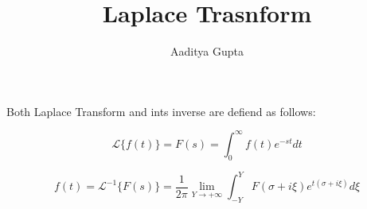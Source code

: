 \documentclass[12pt, onecolumn]{article}
\title{\bf{Laplace Trasnform}}
\author{Aaditya Gupta}
\begin{document}
\maketitle

Both Laplace Transform and ints inverse are defiend as follows:

\begin{equation}
    \mathcal{L}\{f(t)\} = F(s) = \int_{0}^{\infty} f(t)e^{-st} dt
    
    \label{eq: Laplace Transform}
\end{equation}

\begin{equation}
    f(t) = \mathcal{L}^{-1}\{ F(s) \} = \frac{1}{2\pi} \lim_{Y \to +\infty} \int_{-Y}^{Y} F(\sigma + i\xi)e^{t(\sigma + i\xi)}d\xi
    \label{eq:Inverse Laplace}
\end{equation}
\end{document}
